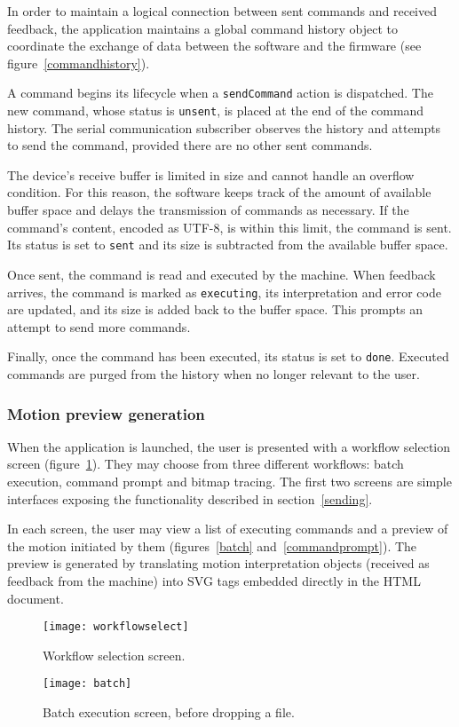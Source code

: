 In order to maintain a logical connection between sent commands and received
feedback, the application maintains a global command history object to
coordinate the exchange of data between the software and the firmware
(see figure~\ref{commandhistory}).

A command begins its lifecycle when a \texttt{sendCommand} action is dispatched.
The new command, whose status is \texttt{unsent}, is placed at the end of the
command history. The serial communication subscriber observes the history and
attempts to send the command, provided there are no other sent commands.

The device's receive buffer is limited in size and cannot handle an overflow
condition. For this reason, the software keeps track of the amount of available
buffer space and delays the transmission of commands as necessary. If the
command's content, encoded as UTF-8, is within this limit, the command is sent.
Its status is set to \texttt{sent} and its size is subtracted from the
available buffer space.

Once sent, the command is read and executed by the machine. When feedback
arrives, the command is marked as \texttt{executing}, its interpretation and
error code are updated, and its size is added back to the buffer space.
This prompts an attempt to send more commands.

Finally, once the command has been executed, its status is set to \texttt{done}.
Executed commands are purged from the history when no longer relevant to the
user.

\subsubsection{Motion preview generation}

When the application is launched, the user is presented with a workflow
selection screen (figure~\ref{workflow}). They may choose from three different
workflows: batch execution, command prompt and bitmap tracing. The first two
screens are simple interfaces exposing the functionality described in
section~\ref{sending}.

In each screen, the user may view a list of executing commands and a preview
of the motion initiated by them (figures~\ref{batch} and~\ref{commandprompt}).
The preview is generated by translating motion interpretation objects
(received as feedback from the machine) into SVG tags embedded directly in the
HTML document.

\clearpage
\begin{figure}[ht]
    \begin{center}
        \texttt{[image: workflowselect]}
        \caption{Workflow selection screen.}
        \label{workflow}
    \end{center}
\end{figure}
\begin{figure}[ht!]
    \begin{center}
        \texttt{[image: batch]}
        \caption{Batch execution screen, before dropping a file.}
    \end{center}
\end{figure}

